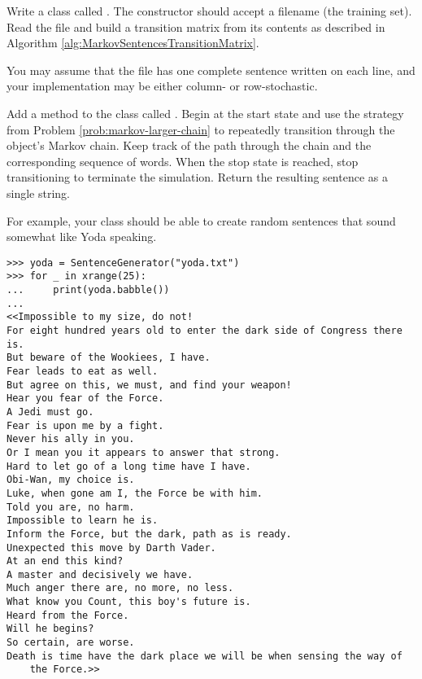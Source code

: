 \newpage

\begin{problem} %
Write a class called .
The constructor should accept a filename (the training set).
Read the file and build a transition matrix from its contents as described in Algorithm \ref{alg:MarkovSentencesTransitionMatrix}.

You may assume that the file has one complete sentence written on each line, and your implementation may be either column- or row-stochastic.
\label{problem:markov-random-sentences-init}
\end{problem}

\begin{problem} %
Add a method to the  class called .
Begin at the start state and use the strategy from Problem \ref{prob:markov-larger-chain} to repeatedly transition through the object's Markov chain.
Keep track of the path through the chain and the corresponding sequence of words.
When the stop state is reached, stop transitioning to terminate the simulation.
Return the resulting sentence as a single string.

For example, your  class should be able to create random sentences that sound somewhat like Yoda speaking.

\begin{lstlisting}
>>> yoda = SentenceGenerator("yoda.txt")
>>> for _ in xrange(25):
... 	print(yoda.babble())
...
<<Impossible to my size, do not!
For eight hundred years old to enter the dark side of Congress there is.
But beware of the Wookiees, I have.
Fear leads to eat as well.
But agree on this, we must, and find your weapon!
Hear you fear of the Force.
A Jedi must go.
Fear is upon me by a fight.
Never his ally in you.
Or I mean you it appears to answer that strong.
Hard to let go of a long time have I have.
Obi-Wan, my choice is.
Luke, when gone am I, the Force be with him.
Told you are, no harm.
Impossible to learn he is.
Inform the Force, but the dark, path as is ready.
Unexpected this move by Darth Vader.
At an end this kind?
A master and decisively we have.
Much anger there are, no more, no less.
What know you Count, this boy's future is.
Heard from the Force.
Will he begins?
So certain, are worse.
Death is time have the dark place we will be when sensing the way of
    the Force.>>
\end{lstlisting}

\label{prob:markov-random-sentences-babble}
\end{problem}

